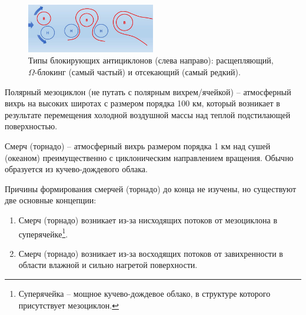 \begin{figure}[!ht]
\centering
\includegraphics[width=0.5\textwidth]{images/atm_block.jpeg}
\caption{Типы блокирующих антициклонов  (слева направо): расщепляющий, $\Omega$-блокинг (самый частый) и отсекающий (самый редкий).}\label{fig:atm_block}
\end{figure}

Полярный мезоциклон (не путать с полярным вихрем/ячейкой) -- атмосферный вихрь на высоких широтах с размером порядка 100 км, который возникает в результате перемещения холодной воздушной массы над теплой подстилающей поверхностью.

Смерч (торнадо) -- атмосферный вихрь размером порядка 1 км над сушей (океаном) преимущественно с циклоническим направлением вращения.
Обычно образуется из  кучево-дождевого облака.

Причины формирования смерчей (торнадо) до конца не изучены, но существуют две основные концепции:
\begin{enumerate}
\item Смерч (торнадо) возникает из-за нисходящих потоков от мезоциклона в суперячейке\footnote{Суперячейка -- мощное кучево-дождевое облако, в структуре которого присутствует мезоциклон.}.
\item Смерч (торнадо) возникает из-за восходящих потоков от завихренности в области влажной и сильно нагретой поверхности.
\end{enumerate}
